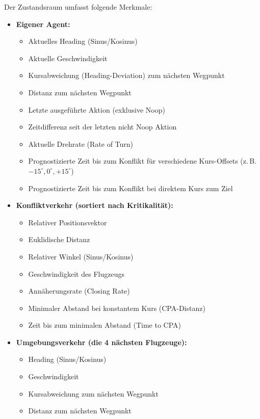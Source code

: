 Der Zustandsraum umfasst folgende Merkmale:
\begin{itemize}
    \item \textbf{Eigener Agent:}
    \begin{itemize}
        \item Aktuelles Heading (Sinus/Kosinus)
        \item Aktuelle Geschwindigkeit
        \item Kursabweichung (Heading\hyp{}Deviation) zum nächsten Wegpunkt
        \item Distanz zum nächsten Wegpunkt
        \item Letzte ausgeführte Aktion (exklusive Noop)
        \item Zeitdifferenz seit der letzten nicht Noop Aktion
        \item Aktuelle Drehrate (Rate of Turn)
        \item Prognostizierte Zeit bis zum Konflikt für verschiedene Kurs-Offsets (z.\,B. $-15^\circ, 0^\circ, +15^\circ$)
        \item Prognostizierte Zeit bis zum Konflikt bei direktem Kurs zum Ziel
    \end{itemize}
    \item \textbf{Konfliktverkehr (sortiert nach Kritikalität):}
    \begin{itemize}
        \item Relativer Positionsvektor
        \item Euklidische Distanz
        \item Relativer Winkel (Sinus/Kosinus)
        \item Geschwindigkeit des Flugzeugs
        \item Annäherungsrate (Closing Rate)
        \item Minimaler Abstand bei konstantem Kurs (\ac{CPA}\hyp{}Distanz)
        \item Zeit bis zum minimalen Abstand (Time to \ac{CPA})
    \end{itemize}
    \item \textbf{Umgebungsverkehr (die 4 nächsten Flugzeuge):}
    \begin{itemize}
        \item Heading (Sinus/Kosinus)
        \item Geschwindigkeit
        \item Kursabweichung zum nächsten Wegpunkt
        \item Distanz zum nächsten Wegpunkt
    \end{itemize}
\end{itemize}

